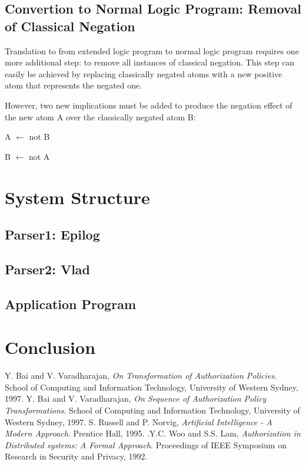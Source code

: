 \documentclass[a4paper]{article}
\begin{document}
    \subsection{Convertion to Normal Logic Program: Removal of Classical Negation}

      Translation to from extended logic program to normal logic program 
      requires one more additional step: to remove all instances of classical 
      negation. This step can easily be achieved by replacing classically
      negated atoms with a new positive atom that represents the negated one.

      However, two new implications must be added to produce the negation
      effect of the new atom A over the classically negated atom B:

      \begin{list}{}{}
        \item A $\leftarrow$ not B
        \item B $\leftarrow$ not A
      \end{list}

    \pagebreak

  \section{System Structure}

    \subsection{Parser1: Epilog}

    \subsection{Parser2: Vlad}

    \subsection{Application Program}

    \pagebreak

  \section{Conclusion}

    \pagebreak

  \begin{thebibliography}{}
    Y. Bai and V. Varadharajan, \emph{On Transformation of Authorization Policies}. School of Computing and Information Technology, University of Western Sydney, 1997.
    Y. Bai and V. Varadharajan, \emph{On Sequence of Authorization Policy Transformations}. School of Computing and Information Technology, University of Western Sydney, 1997.
    S. Russell and P. Norvig, \emph{Artificial Intelligence - A Modern Approach}. Prentice Hall, 1995.
    .Y.C. Woo and S.S. Lam, \emph{Authorization in Distributed systems: A Formal Approach}. Proceedings of IEEE Symposium on Research in Security and Privacy, 1992.
  \end{thebibliography}
\end{document}
